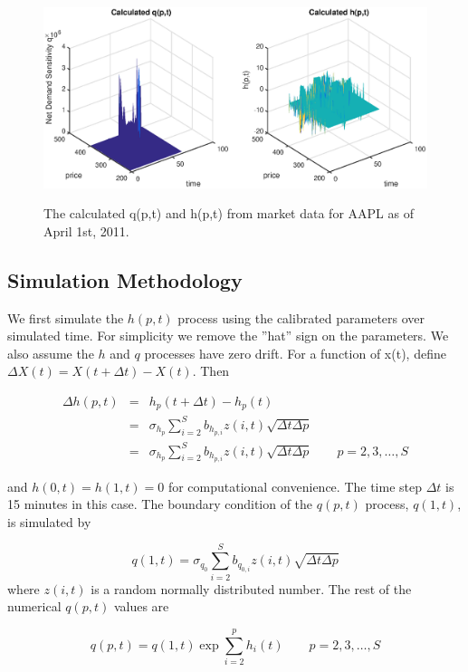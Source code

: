 \documentclass{article}
\begin{document}
\begin{center}
\begin{figure}
  \centering
  \includegraphics[scale = 0.5]{q_and_h.eps}\\
  \caption{The calculated q(p,t) and h(p,t) from market data for AAPL as of April 1st, 2011.}\label{fig::AAPL_20110401_q_and_h}
\end{figure}
\end{center}


\subsection{Simulation Methodology}
We first simulate the $h(p,t)$ process using the calibrated parameters over simulated time. For simplicity we remove the ''hat'' sign on the parameters. We also assume the $h$ and $q$ processes have zero drift. For a function of x(t), define $\Delta X(t) = X(t+\Delta t) - X(t)$. Then

\begin{eqnarray*}
\Delta h(p,t) &=& h_p(t+\Delta t) - h_p(t) \\
        &=& \sigma_{h_p} \sum_{i=2}^{S} b_{h_{p, i}} z(i,t) \sqrt{\Delta t \Delta p} \\
        &=& \sigma_{h_p} \sum_{i=2}^{S} b_{h_{p, i}} z(i,t) \sqrt{\Delta t \Delta p} \qquad p = 2, 3, \ldots, S
\end{eqnarray*}

and $h(0,t) = h(1,t) = 0$ for computational convenience. The time step $\Delta t$ is 15 minutes in this case. The boundary condition of the $q(p,t)$ process, $q(1,t)$, is simulated by

$$
q(1,t) = \sigma_{q_0} \sum_{i=2}^{S} b_{q_{0, i}} z(i,t) \sqrt{\Delta t \Delta p}
$$
where $z(i,t)$ is a random normally distributed number. The rest of the numerical $q(p,t)$ values are

$$
q(p,t) = q(1,t) \exp{\sum_{i=2}^{p}h_i(t)} \qquad p = 2, 3, \ldots, S
$$
\end{document}
